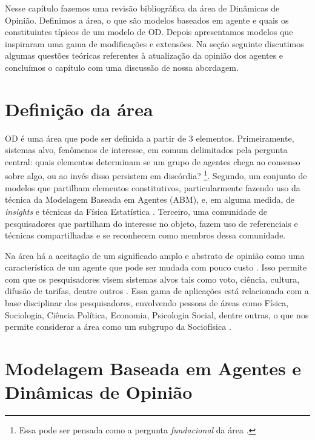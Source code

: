 Nesse capítulo fazemos uma revisão bibliográfica da área de Dinâmicas de
Opinião. Definimos a área, o que são modelos baseados em agente e quais os
constituintes típicos de um modelo de OD. Depois apresentamos modelos que
inspiraram uma gama de modificações e extensões. Na seção seguinte discutimos
algumas questões teóricas referentes à atualização da opinião dos agentes e
concluímos o capítulo com uma discussão de nossa abordagem.


\section{Definição da área}

OD é uma área que pode ser definida a partir de 3 elementos. Primeiramente,
sistemas alvo, fenômenos de interesse, em comum delimitados pela pergunta
central: quais elementos determinam se um grupo de agentes chega ao consenso
sobre algo, ou ao invés disso persistem em discórdia?
\cite{castellano2012social}\footnote{Essa pode ser pensada como a pergunta
  \textit{fundacional} da área \cite{flache2017}.}. Segundo, um conjunto de
modelos que partilham elementos constitutivos, particularmente fazendo uso da
técnica da Modelagem Baseada em Agentes (ABM), e, em alguma medida, de
\textit{insights} e técnicas da Física Estatística \cite{galam1990social}.
Terceiro, uma comunidade de pesquisadores que partilham do interesse no objeto,
fazem uso de referenciais e técnicas compartilhadas e se reconhecem como membros
dessa comunidade.

Na área há a aceitação de um significado amplo e abstrato de opinião como uma
característica de um agente que pode ser mudada com pouco custo
\cite[p.312]{castellano2012social}. Isso permite com que os pesquisadores visem
sistemas alvos tais como voto, ciência, cultura, difusão de tarifas, dentre
outros
\cite{kowalska2013going,martins2015thou,axelrod1997dissemination,galam1990social}.
Essa gama de aplicações está relacionada com a base disciplinar dos
pesquisadores, envolvendo pessoas de áreas como Física, Sociologia, Ciência
Política, Economia, Psicologia Social, dentre outras, o que nos permite
considerar a área como um subgrupo da Sociofísica
\cite{galam1982sociophysics,galam2012sociophysics}.


\section{Modelagem Baseada em Agentes e Dinâmicas de Opinião}

